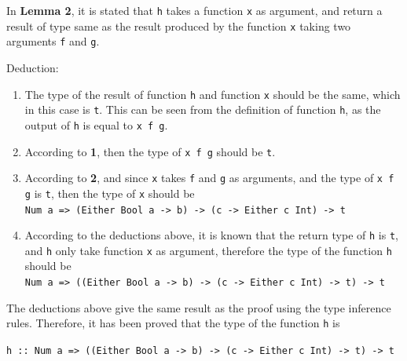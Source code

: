 \documentclass[12pt]{article}
\newcommand{\haskell}{\texttt}
\newenvironment{question}[2][Question]{\begin{trivlist}
\item[\hskip \labelsep {\bfseries #1}\hskip \labelsep {\bfseries #2.}]}{\end{trivlist}}
\begin{document}
In \textbf{Lemma 2}, it is stated that \haskell{h} takes a function \haskell{x} as argument, and return a result of type same as the result produced by the function \haskell{x} taking two arguments \haskell{f} and \haskell{g}.
\begin{mdframed}
Deduction:
\begin{enumerate}
    \item The type of the result of function \haskell{h} and function \haskell{x} should be the same, which in this case is \haskell{t}. This can be seen from the definition of function \haskell{h}, as the output of \haskell{h} is equal to \haskell{x f g}.
    \item According to \textbf{1}, then the type of \haskell{x f g} should be \haskell{t}.
    \item According to \textbf{2}, and since \haskell{x} takes \haskell{f} and \haskell{g} as arguments, and the  type of \haskell{x f g} is \haskell{t}, then the type of \haskell{x} should be \\
    \haskell{Num a => (Either Bool a -> b) -> (c -> Either c Int) -> t}
    \item According to the deductions above, it is known that the return type of \haskell{h} is \haskell{t}, and \haskell{h} only take function \haskell{x} as argument, therefore the type of the function \haskell{h} should be \\ \haskell{Num a => ((Either Bool a -> b) -> (c -> Either c Int) -> t) -> t}
\end{enumerate}
\end{mdframed}
The deductions above give the same result as the proof using the type inference rules. Therefore, it has been proved that the type of the function \haskell{h} is
\begin{center}
    \haskell{h :: Num a => ((Either Bool a -> b) -> (c -> Either c Int) -> t) -> t}
\end{center}


\newpage\begin{question}{3}
\end{question}
\end{document}
